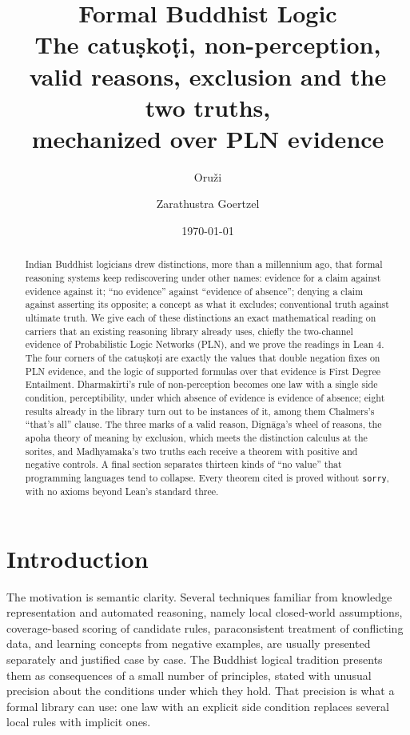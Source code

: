 \documentclass[11pt]{article}
\title{Formal Buddhist Logic\\[2pt]
\large The catuṣkoṭi, non-perception, valid reasons, exclusion and the two truths,\\
mechanized over PLN evidence}
\author{Oru\v{z}i \and Zarathustra Goertzel}
\date{\today}
\newcommand{\code}[1]{\texttt{#1}}
\theoremstyle{plain}
\theoremstyle{definition}
\begin{document}
\maketitle

\begin{abstract}
Indian Buddhist logicians drew distinctions, more than a millennium ago, that formal
reasoning systems keep rediscovering under other names: evidence for a claim against
evidence against it; ``no evidence'' against ``evidence of absence''; denying a claim
against asserting its opposite; a concept as what it excludes; conventional truth against
ultimate truth. We give each of these distinctions an exact mathematical reading on
carriers that an existing reasoning library already uses, chiefly the two-channel evidence
of Probabilistic Logic Networks (PLN), and we prove the readings in Lean 4.
The four corners of the catuṣkoṭi are exactly the values that double negation fixes on PLN
evidence, and the logic of supported formulas over that evidence is First Degree
Entailment. Dharmakīrti's rule of non-perception becomes one law with a single side
condition, perceptibility, under which absence of evidence is evidence of absence; eight
results already in the library turn out to be instances of it, among them Chalmers's
``that's all'' clause. The three marks of a valid reason, Dignāga's wheel of reasons, the
apoha theory of meaning by exclusion, which meets the distinction calculus at the sorites, and
Madhyamaka's two truths each receive a theorem
with positive and negative controls. A final section separates thirteen kinds of
``no value'' that programming languages tend to collapse. Every theorem cited is proved
without \code{sorry}, with no axioms beyond Lean's standard three.
\end{abstract}

\tableofcontents

\section{Introduction}

The motivation is semantic clarity. Several techniques familiar from knowledge
representation and automated reasoning, namely local closed-world assumptions, coverage-based
scoring of candidate rules, paraconsistent treatment of conflicting data, and learning
concepts from negative examples, are usually presented separately and justified case by case.
The Buddhist logical tradition presents them as consequences of a small number of
principles, stated with unusual precision about the conditions under which they hold. That
precision is what a formal library can use: one law with an explicit side condition replaces
several local rules with implicit ones.
\end{document}
